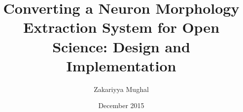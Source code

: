 \title{\bf \large Converting a Neuron Morphology Extraction
System for Open Science: Design and Implementation}
\author{Zakariyya Mughal}
\date{December 2015}



